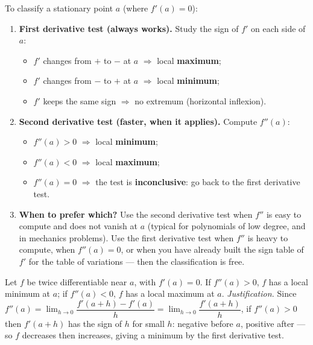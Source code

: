 \documentclass[11pt]{article}
\begin{document}
\begin{methode}
To classify a stationary point $a$ (where $f'(a)=0$):
\begin{enumerate}
\item \textbf{First derivative test (always works).} Study the sign of $f'$ on each side of $a$:
\begin{itemize}
\item $f'$ changes from $+$ to $-$ at $a$ $\Rightarrow$ local \textbf{maximum};
\item $f'$ changes from $-$ to $+$ at $a$ $\Rightarrow$ local \textbf{minimum};
\item $f'$ keeps the same sign $\Rightarrow$ no extremum (horizontal inflexion).
\end{itemize}
\item \textbf{Second derivative test (faster, when it applies).} Compute $f''(a)$:
\begin{itemize}
\item $f''(a)>0$ $\Rightarrow$ local \textbf{minimum};
\item $f''(a)<0$ $\Rightarrow$ local \textbf{maximum};
\item $f''(a)=0$ $\Rightarrow$ the test is \textbf{inconclusive}: go back to the first derivative test.
\end{itemize}
\item \textbf{When to prefer which?} Use the second derivative test when $f''$ is easy to compute and does not vanish at $a$ (typical for polynomials of low degree, and in mechanics problems). Use the first derivative test when $f''$ is heavy to compute, when $f''(a)=0$, or when you have already built the sign table of $f'$ for the table of variations — then the classification is free.
\end{enumerate}
\end{methode}

\begin{propriete}
Let $f$ be twice differentiable near $a$, with $f'(a)=0$. If $f''(a)>0$, $f$ has a local minimum at $a$; if $f''(a)<0$, $f$ has a local maximum at $a$. \emph{Justification.} Since $f''(a)=\lim_{h\to0}\dfrac{f'(a+h)-f'(a)}{h}=\lim_{h\to0}\dfrac{f'(a+h)}{h}$, if $f''(a)>0$ then $f'(a+h)$ has the sign of $h$ for small $h$: negative before $a$, positive after — so $f$ decreases then increases, giving a minimum by the first derivative test.
\end{propriete}
\end{document}
